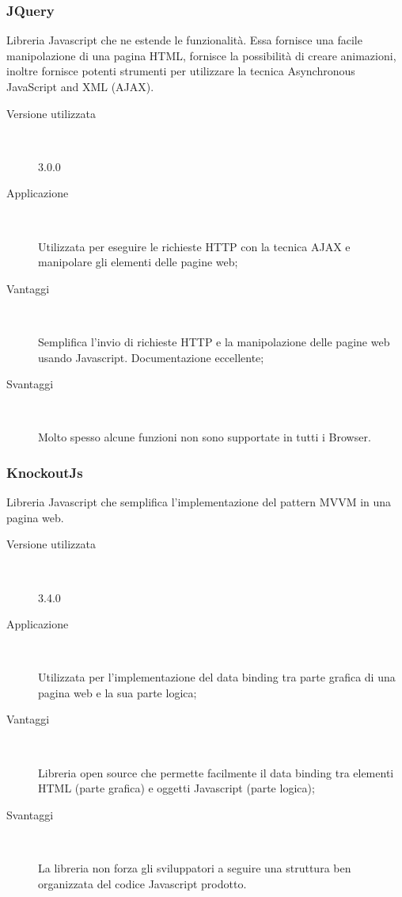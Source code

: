 \documentclass[../RelazioneFinale.tex]{subfiles}
\begin{document}
			\subsubsection{JQuery}
				Libreria Javascript che ne estende le funzionalità. Essa fornisce una  facile manipolazione di una pagina HTML, fornisce la possibilità di creare animazioni, inoltre fornisce potenti strumenti per utilizzare la tecnica Asynchronous JavaScript and XML (AJAX).		
			\begin{description}
				\item[Versione utilizzata] \ \par
				3.0.0
				\item[Applicazione] \ \par
				Utilizzata per eseguire le richieste HTTP con la tecnica AJAX e manipolare gli elementi delle pagine web;
				\item[Vantaggi] \ \par
				Semplifica l'invio di richieste HTTP e la manipolazione delle pagine web usando Javascript. Documentazione eccellente;
				\item[Svantaggi] \ \par
				Molto spesso alcune funzioni non sono supportate in tutti i Browser.
			\end{description}
			
			
			\subsubsection{KnockoutJs}
				Libreria Javascript che semplifica l'implementazione del pattern MVVM in una pagina web.
			\begin{description}
				\item[Versione utilizzata] \ \par
				3.4.0
				\item[Applicazione] \ \par
				Utilizzata per l'implementazione del data binding tra parte grafica di una pagina web e la sua parte logica;
				\item[Vantaggi] \ \par
				Libreria open source che permette facilmente il data binding tra elementi HTML (parte grafica) e oggetti Javascript (parte logica);
				\item[Svantaggi] \ \par
				La libreria non forza gli sviluppatori a seguire una struttura ben organizzata del codice Javascript prodotto.
			\end{description}
		
\end{document}
